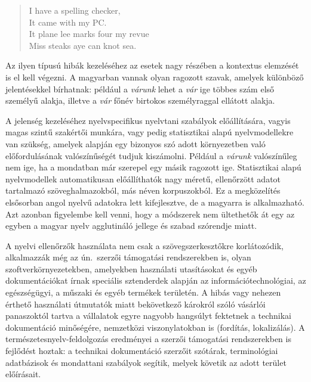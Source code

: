 \begin{multicols}{2}
\begin{quote}
  I have a spelling checker,\\
  It came with my PC.\\
  It plane lee marks four my revue\\
  Miss steaks aye can knot sea.
\end{quote}

Az ilyen típusú hibák kezeléséhez az esetek nagy részében a kontextus elemzését is el kell végezni. A magyarban vannak olyan ragozott szavak, amelyek különböző jelentésekkel bírhatnak: például a \textit{várunk} lehet a \textit{vár} ige többes szám első személyű alakja, illetve a \textit{vár} főnév birtokos személyraggal ellátott alakja. 

A jelenség kezeléséhez nyelvspecifikus nyelvtani szabályok előállítására, vagyis magas szintű szakértői munkára, vagy pedig  statisztikai alapú nyelvmodellekre van szükség, amelyek alapján egy bizonyos szó adott környezetben való előfordulásának valószínűségét tudjuk kiszámolni. Például a \textit{várunk} valószínűleg nem ige, ha a mondatban már szerepel egy másik ragozott ige. Statisztikai alapú nyelvmodellek automatikusan előállíthatók nagy méretű, ellenőrzött adatot tartalmazó szöveghalmazokból, más néven korpuszokból. Ez a megközelítés elsősorban angol nyelvű adatokra lett kifejlesztve, de a magyarra is alkalmazható. Azt azonban figyelembe kell venni, hogy a módszerek nem ültethetők át egy az egyben a magyar nyelv agglutináló jellege és szabad szórendje miatt.


A nyelvi ellenőrzők használata nem csak a szövegszerkesztőkre korlátozódik, al\-kal\-maz\-zák még az ún.\ szerzői támogatási rendszerekben is, olyan szoftverkörnyezetekben, amelyekben használati utasításokat és egyéb dokumentációkat írnak speciális szten\-der\-dek alapján az információtechnológiai, az egészségügyi, a műszaki és egyéb termékek területén. A hibás vagy nehezen érthető használati útmutatók miatt bekövetkező károkról szóló vásárlói panaszoktól tartva a vállalatok egyre nagyobb hangsúlyt fektetnek a technikai dokumentáció minőségére, nemzetközi viszonylatokban is (fordítás, lokalizálás). A természetesnyelv-feldolgozás ered\-mé\-nyei a szerzői támogatási rendszerekben is fejlődést hoztak: a technikai dokumentáció szerzőit szótárak, terminológiai adatbázisok és mondattani szabályok segítik, melyek követik az adott terület előírásait.


\end{multicols}
